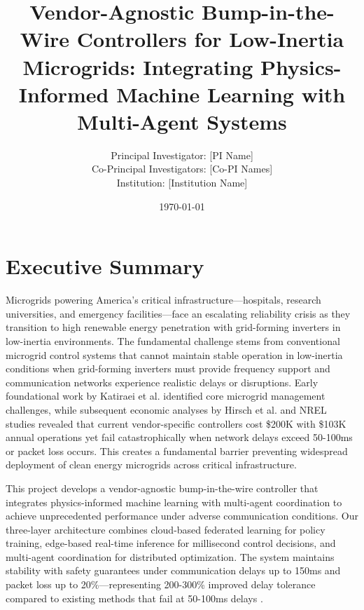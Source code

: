 \documentclass[12pt]{article}
\begin{document}
\title{\Large\textbf{Vendor-Agnostic Bump-in-the-Wire Controllers for Low-Inertia Microgrids: Integrating Physics-Informed Machine Learning with Multi-Agent Systems}}


\author{Principal Investigator: [PI Name]\\
Co-Principal Investigators: [Co-PI Names]\\
Institution: [Institution Name]}

\date{\today}

\maketitle

\section{Executive Summary}

Microgrids powering America's critical infrastructure---hospitals, research universities, and emergency facilities---face an escalating reliability crisis as they transition to high renewable energy penetration with grid-forming inverters in low-inertia environments. The fundamental challenge stems from conventional microgrid control systems that cannot maintain stable operation in low-inertia conditions when grid-forming inverters must provide frequency support and communication networks experience realistic delays or disruptions. Early foundational work by Katiraei et al. \cite{katiraei2008} identified core microgrid management challenges, while subsequent economic analyses by Hirsch et al. \cite{hirsch2018} and NREL studies \cite{sigrin2019} revealed that current vendor-specific controllers cost \$200K with \$103K annual operations yet fail catastrophically when network delays exceed 50-100ms or packet loss occurs. This creates a fundamental barrier preventing widespread deployment of clean energy microgrids across critical infrastructure.

This project develops a vendor-agnostic bump-in-the-wire controller that integrates physics-informed machine learning with multi-agent coordination to achieve unprecedented performance under adverse communication conditions. Our three-layer architecture combines cloud-based federated learning for policy training, edge-based real-time inference for millisecond control decisions, and multi-agent coordination for distributed optimization. The system maintains stability with safety guarantees under communication delays up to 150ms and packet loss up to 20\%—representing 200-300\% improved delay tolerance compared to existing methods that fail at 50-100ms delays \cite{baseline2023delay}.
\end{document}
